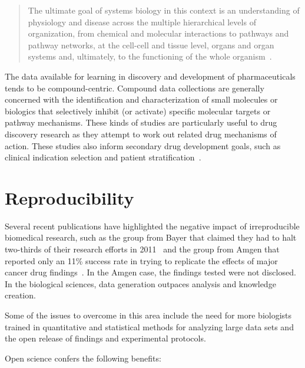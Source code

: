 \begin{quote}
The ultimate goal of systems biology in this context is an understanding of physiology and disease across the multiple hierarchical levels of organization, from chemical and molecular interactions to pathways and pathway networks, at the cell-cell and tissue level, organs and organ systems and, ultimately, to the functioning of the whole organism~\cite{Berg2014}.
\end{quote}

The data available for learning in discovery and development of pharmaceuticals tends to be compound-centric. Compound data collections are generally concerned with the identification and characterization of small molecules or biologics that selectively inhibit (or activate) specific molecular targets or pathway mechanisms. These kinds of studies are particularly useful to drug discovery research as they attempt to work out related drug mechanisms of action. These studies also inform secondary drug development goals, such as clinical indication selection and patient stratification~\cite{Berg2014}.


\section{Reproducibility}

Several recent publications have highlighted the negative impact of irreproducible biomedical research, such as the group from Bayer that claimed they had to halt two-thirds of their research efforts in 2011~\cite{Prinz2011} and the group from Amgen that reported only an 11\% success rate in trying to replicate the effects of major cancer drug findings~\cite{Begley2012}. In the Amgen case, the findings tested were not disclosed. In the biological sciences, data generation outpaces analysis and knowledge creation.

Some of the issues to overcome in this area include the need for more biologists trained in quantitative and statistical methods for analyzing large data sets and the open release of findings and experimental protocols. 

Open science confers the following benefits:

